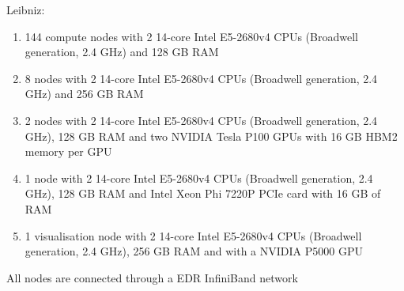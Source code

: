 Leibniz:
  \begin{enumerate}
  \item 144 compute nodes with 2 14-core Intel E5-2680v4 CPUs (Broadwell generation, 2.4 GHz) and 128 GB RAM
  \item 8 nodes with 2 14-core Intel E5-2680v4 CPUs (Broadwell generation, 2.4 GHz) and 256 GB RAM
  \item 2 nodes with 2 14-core Intel E5-2680v4 CPUs (Broadwell generation, 2.4 GHz), 128 GB RAM and two NVIDIA Tesla P100 GPUs with 16 GB HBM2 memory per GPU
  \item 1 node with 2 14-core Intel E5-2680v4 CPUs (Broadwell generation, 2.4 GHz), 128 GB RAM and Intel Xeon Phi 7220P PCIe card with 16 GB of RAM
  \item 1 visualisation node with 2 14-core Intel E5-2680v4 CPUs (Broadwell generation, 2.4 GHz), 256 GB RAM and with a NVIDIA P5000 GPU
  \end{enumerate}
All nodes are connected through a EDR InfiniBand network
\fi
\ifleuven
